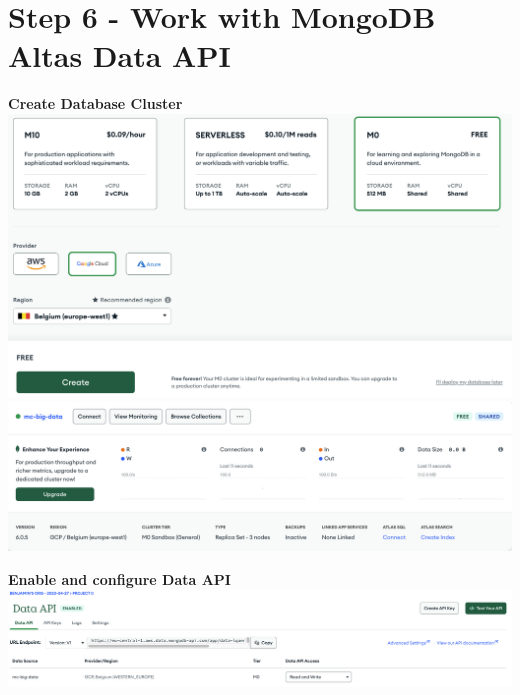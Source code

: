 \documentclass[14pt,a4paper]{extarticle}
\begin{document}
	\section*{Step 6 - Work with MongoDB Altas Data API}
	\noindent \textbf{Create Database Cluster} \\
	\includegraphics[width=\textwidth]{images/sc01.png}
	\includegraphics[width=\textwidth]{images/sc02.png}

	\vspace{1cm}

	\noindent \textbf{Enable and configure Data API} \\
	\includegraphics[width=\textwidth]{images/sc03.png}

	\newpage
\end{document}

